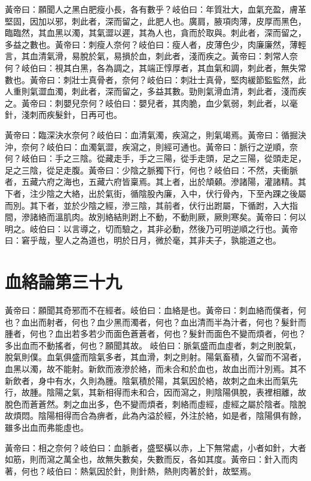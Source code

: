 黃帝曰：願聞人之黑白肥瘦小長，各有數乎？岐伯曰：年質壯大，血氣充盈，膚革堅固，因加以邪，刺此者，深而留之，此肥人也。廣肩，腋項肉薄，皮厚而黑色，臨臨然，其血黑以濁，其氣澀以遲，其為人也，貪而於取與。刺此者，深而留之，多益之數也。黃帝曰：刺瘦人奈何？岐伯曰：瘦人者，皮薄色少，肉廉廉然，薄輕言，其血清氣滑，易脫於氣，易損於血，刺此者，淺而疾之。黃帝曰：刺常人奈何？岐伯曰：視其白黑，各為調之，其端正惇厚者，其血氣和調，刺此者，無失常數也。黃帝曰：刺壯士真骨者，奈何？岐伯曰：刺壯士真骨，堅肉緩節監監然，此人重則氣澀血濁，刺此者，深而留之，多益其數。勁則氣滑血清，刺此者，淺而疾之。黃帝曰：刺嬰兒奈何？岐伯曰：嬰兒者，其肉脆，血少氣弱，刺此者，以毫針，淺刺而疾髮針，日再可也。

黃帝曰：臨深決水奈何？岐伯曰：血清氣濁，疾瀉之，則氣竭焉。黃帝曰：循掘決沖，奈何？岐伯曰：血濁氣澀，疾瀉之，則經可通也。黃帝曰：脈行之逆順，奈何？岐伯曰：手之三陰。從藏走手，手之三陽，從手走頭，足之三陽，從頭走足，足之三陰，從足走腹。黃帝曰：少陰之脈獨下行，何也？岐伯曰：不然，夫衝脈者，五藏六府之海也，五藏六府皆稟焉。其上者，出於頏顙。滲諸陽，灌諸精。其下者，注少陰之大絡，出於氣街，循陰股內廉，入中，伏行骨內，下至內踝之後屬而別。其下者，並於少陰之經，滲三陰，其前者，伏行出跗屬，下循跗，入大指間，滲諸絡而溫肌肉。故別絡結則跗上不動，不動則厥，厥則寒矣。黃帝曰：何以明之。岐伯曰：以言導之，切而驗之，其非必動，然後乃可明逆順之行也。黃帝曰：窘乎哉，聖人之為道也，明於日月，微於毫，其非夫子，孰能道之也。



\section{血絡論第三十九}

黃帝曰：願聞其奇邪而不在經者。岐伯曰：血絡是也。黃帝曰：刺血絡而僕者，何也？血出而射者，何也？血少黑而濁者，何也？血出清而半為汁者，何也？髮針而腫者，何也？血出若多若少而面色蒼蒼者，何也？髮針而面色不變而煩者，何也？多出血而不動搖者，何也？願聞其故。
岐伯曰：脈氣盛而血虛者，刺之則脫氣，脫氣則僕。血氣俱盛而陰氣多者，其血滑，刺之則射。陽氣畜積，久留而不瀉者，血黑以濁，故不能射。新飲而液滲於絡，而未合和於血也，故血出而汁別焉。其不新飲者，身中有水，久則為腫。陰氣積於陽，其氣因於絡，故刺之血未出而氣先行，故腫。陰陽之氣，其新相得而未和合，因而瀉之，則陰陽俱脫，表裡相離，故脫色而蒼蒼然。刺之血出多，色不變而煩者，刺絡而虛經，虛經之屬於陰者。陰脫故煩悶。陰陽相得而合為痹者，此為內溢於經，外注於絡，如是者，陰陽俱有餘，雖多出血而弗能虛也。

黃帝曰：相之奈何？岐伯曰：血脈者，盛堅橫以赤，上下無常處，小者如針，大者如筋，則而瀉之萬全也，故無失數矣，失數而反，各如其度。黃帝曰：針入而肉著，何也？岐伯曰：熱氣因於針，則針熱，熱則肉著於針，故堅焉。

